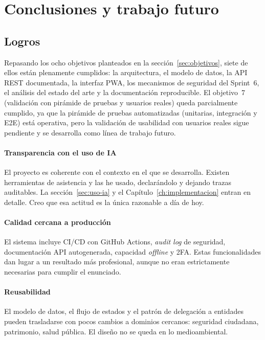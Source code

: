 \chapter{Conclusiones y trabajo futuro}
\label{ch:conclusiones}

\section{Logros}
\label{sec:logros}

Repasando los ocho objetivos planteados en la sección~\ref{sec:objetivos}, siete de ellos están plenamente cumplidos: la arquitectura, el modelo de datos, la API REST documentada, la interfaz PWA, los mecanismos de seguridad del Sprint~6, el análisis del estado del arte y la documentación reproducible. El objetivo~7 (validación con pirámide de pruebas y usuarios reales) queda parcialmente cumplido, ya que la pirámide de pruebas automatizadas (unitarias, integración y E2E) está operativa, pero la validación de usabilidad con usuarios reales sigue pendiente y se desarrolla como línea de trabajo futuro.



\subsubsection*{Transparencia con el uso de IA}
  El proyecto es coherente con el contexto en el que se desarrolla. Existen herramientas de asistencia y las he usado, declarándolo y dejando trazas auditables. La sección~\ref{sec:uso-ia} y el Capítulo~\ref{ch:implementacion} entran en detalle. Creo que esa actitud es la única razonable a día de hoy.

\subsubsection*{Calidad cercana a producción}
  El sistema incluye CI/CD con GitHub Actions, \textit{audit log} de seguridad, documentación API autogenerada, capacidad \textit{offline} y 2FA. Estas funcionalidades dan lugar a un resultado más profesional, aunque no eran estrictamente necesarias para cumplir el enunciado.

\subsubsection*{Reusabilidad}
  El modelo de datos, el flujo de estados y el patrón de delegación a entidades pueden trasladarse con pocos cambios a dominios cercanos: seguridad ciudadana, patrimonio, salud pública. El diseño no se queda en lo medioambiental.


